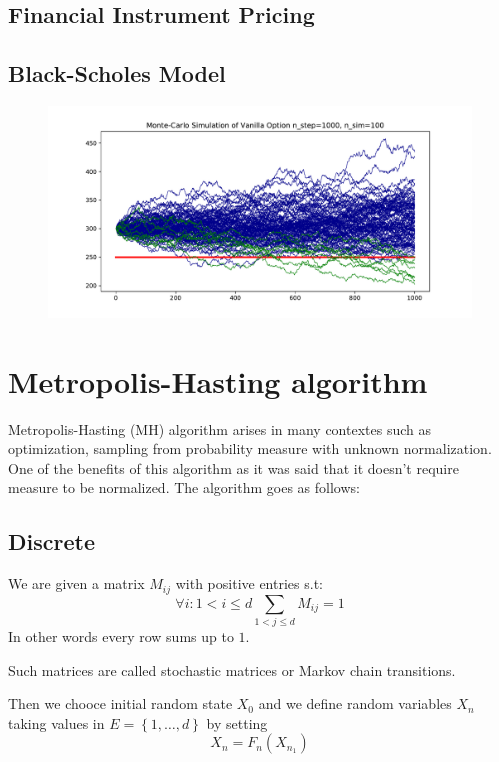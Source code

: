 \begin{heur}
 \section{Financial Instrument Pricing}
 \subsection{Black-Scholes Model}
 \begin{figure}
 	\centering
 	\includegraphics[width=0.8\linewidth]{numerical/figures/mcoption}
 	\caption{}
 	\label{fig:mcoption}
 \end{figure}
 
\end{heur}

\section{Metropolis-Hasting algorithm}
	Metropolis-Hasting (MH) algorithm arises in many contextes such as optimization, sampling from probability measure with unknown normalization. One of the benefits of this algorithm as it was said that it doesn't require measure to be normalized. The algorithm goes
	as follows:
	
	\subsection{Discrete}
	
	We are given a matrix $M_{ij}$ with positive entries s.t:
	\begin{equation}
		\forall i : 1 < i \le d  \sum_{ 1 < j \le d} M_{ij} = 1
	\end{equation}
	In other words every row sums up to $1$.
	
	Such matrices are called stochastic matrices or Markov chain transitions.
	
	Then we chooce initial random state $X_0$ and we define random variables $X_{n}$ taking values in $E = \left\{1, \ldots, d\right\}$
	by setting 
	\begin{equation}
		X_n = F_n(X_{n_1})	
	\end{equation}
	
